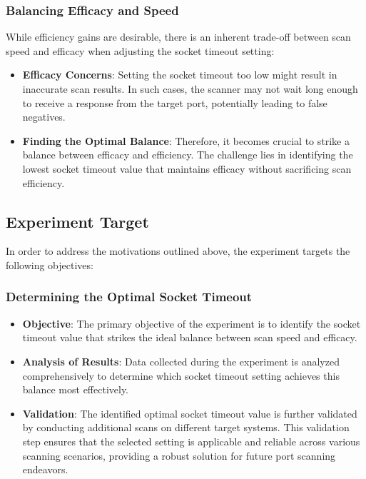 \subsubsection{Balancing Efficacy and Speed}

While efficiency gains are desirable, there is an inherent trade-off between scan speed and efficacy when adjusting the socket timeout setting:

\begin{itemize}
  \item \textbf{Efficacy Concerns}: Setting the socket timeout too low might result in inaccurate scan results. In such cases, the scanner may not wait long enough to receive a response from the target port, potentially leading to false negatives.

  \item \textbf{Finding the Optimal Balance}: Therefore, it becomes crucial to strike a balance between efficacy and efficiency. The challenge lies in identifying the lowest socket timeout value that maintains efficacy without sacrificing scan efficiency.
\end{itemize}

\subsection{Experiment Target}

In order to address the motivations outlined above, the experiment targets the following objectives:

\subsubsection{Determining the Optimal Socket Timeout}

\begin{itemize}
  \item \textbf{Objective}: The primary objective of the experiment is to identify the socket timeout value that strikes the ideal balance between scan speed and efficacy.
  
  \item \textbf{Analysis of Results}: Data collected during the experiment is analyzed comprehensively to determine which socket timeout setting achieves this balance most effectively.
  
  \item \textbf{Validation}: The identified optimal socket timeout value is further validated by conducting additional scans on different target systems. This validation step ensures that the selected setting is applicable and reliable across various scanning scenarios, providing a robust solution for future port scanning endeavors.
\end{itemize}

